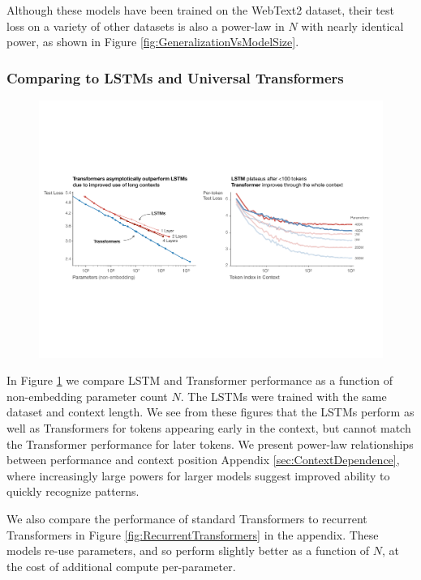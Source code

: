 \documentclass[english]{article}
\begin{document}
Although these models have been trained on the WebText2 dataset, their test loss on a variety of other datasets is also a power-law in $N$ with nearly identical power, as shown in Figure \ref{fig:GeneralizationVsModelSize}.  



\subsubsection{Comparing to LSTMs and Universal Transformers}

\begin{figure}
\begin{centering}
\includegraphics[width=\columnwidth]{LSTMvsTransformerSummary}
\caption[LSTM and Transformer performance comparison]{
\label{fig:LSTMvsTransformers}}  
\end{centering}
\end{figure}


In Figure \ref{fig:LSTMvsTransformers} we compare LSTM and Transformer performance as a function of non-embedding parameter count $N$. The LSTMs were trained with the same dataset and context length.  We see from these figures that the LSTMs perform as well as Transformers for tokens appearing early in the context, but cannot match the Transformer performance for later tokens.  We present power-law relationships between performance and context position Appendix \ref{sec:ContextDependence}, where increasingly large powers for larger models suggest improved ability to quickly recognize patterns.

We also compare the performance of standard Transformers to recurrent Transformers \cite{DBLP:journals/corr/abs-1807-03819} in Figure \ref{fig:RecurrentTransformers} in the appendix.  These models re-use parameters, and so perform slightly better as a function of $N$, at the cost of additional compute per-parameter.
\end{document}
